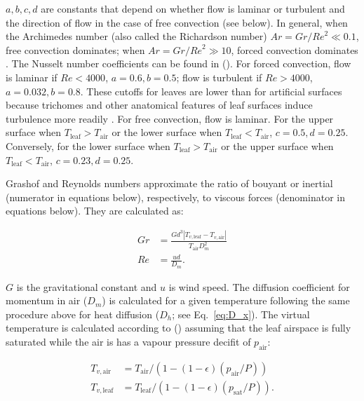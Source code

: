 \documentclass[11pt, oneside]{article}
\begin{document}
$a, b, c, d$ are constants that depend on whether flow is laminar or turbulent and the direction of flow in the case of free convection (see below). In general, when the Archimedes number (also called the Richardson number) $\mathit{Ar} = \mathit{Gr} / \mathit{Re} ^ 2 \ll 0.1$, free convection dominates; when $\mathit{Ar} = \mathit{Gr} / \mathit{Re} ^ 2 \gg 10$, forced convection dominates \citep{Nobel_2009}. The Nusselt number coefficients can be found in \citeauthor{Monteith_Unsworth_2013} (\citeyear{Monteith_Unsworth_2013}). For forced convection, flow is laminar if $\mathit{Re} < 4000$, $a = 0.6, b = 0.5$; flow is turbulent if $\mathit{Re} > 4000$, $a = 0.032, b = 0.8$. These cutoffs for leaves are lower than for artificial surfaces because trichomes and other anatomical features of leaf surfaces induce turbulence more readily \citep{Grace_Wilson_1976}. For free convection, flow is laminar. For the upper surface when $T_\mathrm{leaf} > T_\mathrm{air}$ or the lower surface when $T_\mathrm{leaf} < T_\mathrm{air}$, $c = 0.5, d = 0.25$. Conversely, for the lower surface when $T_\mathrm{leaf} > T_\mathrm{air}$ or the upper surface when $T_\mathrm{leaf} < T_\mathrm{air}$, $c = 0.23, d = 0.25$.

Grashof and Reynolds numbers approximate the ratio of bouyant or inertial (numerator in equations below), respectively, to viscous forces (denominator in equations below). They are calculated as:

\begin{align} \label{eq:GrRe}
  \mathit{Gr} & = \frac{G d ^ 3 |T_{v,\mathrm{leaf}} - T_{v,\mathrm{air}}|}{T_\mathrm{air} D_m ^ 2} \\
  \mathit{Re} & = \frac{u d}{D_m}.
\end{align}

$G$ is the gravitational constant and $u$ is wind speed. The diffusion coefficient for momentum in air ($D_m$) is calculated for a given temperature following the same procedure above for heat diffusion ($D_h$; see Eq.~\ref{eq:D_x}). The virtual temperature is calculated according to \citeauthor{Monteith_Unsworth_2013} (\citeyear{Monteith_Unsworth_2013}) assuming that the leaf airspace is fully saturated while the air is has a vapour pressure decifit of $p_\mathrm{air}$:

\begin{align} \label{eq:Tv}
  T_{v, \mathrm{air}} & = T_\mathrm{air} / (1 - (1 - \epsilon) (p_\mathrm{air} / P)) \\
  T_{v, \mathrm{leaf}} & = T_\mathrm{leaf} / (1 - (1 - \epsilon) (p_\mathrm{sat} / P)).
\end{align}
\end{document}
